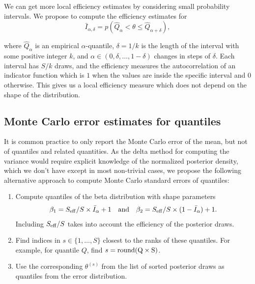 \documentclass[american,]{article}
\theoremstyle{definition}
\begin{document}

We can get more local efficiency estimates by considering small
probability intervals. We propose to compute the efficiency estimates
for
\begin{equation}
\bar{I}_{\alpha,\delta} = p(\hat{Q}_\alpha < \theta \leq \hat{Q}_{\alpha+\delta}),
\end{equation}

where \(\hat{Q}_\alpha\) is an empirical \(\alpha\)-quantile,
\(\delta=1/k\) is the length of the interval with some positive integer
\(k\), and \(\alpha \in (0,\delta,\ldots,1-\delta)\) changes in steps of
\(\delta\). Each interval has \(S/k\) draws, and the efficiency measures
the autocorrelation of an indicator function which is \(1\) when the
values are inside the specific interval and \(0\) otherwise. This gives
us a local efficiency measure which does not depend on the shape of the
distribution.

\hypertarget{mcse}{%
\subsection{Monte Carlo error estimates for quantiles}\label{mcse}}

It is common practice to only report the Monte Carlo error of the mean,
but not of quantiles and related quantities. As the delta method for
computing the variance would require explicit knowledge of the
normalized posterior density, which we don't have except in most non-trivial
cases, we propose the following alternative approach to compute Monte
Carlo standard errors of quantiles:

\begin{enumerate}
\def\labelenumi{\arabic{enumi}.}
\item
  Compute quantiles of the beta distribution with shape parameters
  \begin{equation}
  \beta_1 = S_{\rm eff} / S \times \bar{I}_\alpha+1 \quad \text{and} \quad
  \beta_2 = S_{\rm eff} / S \times (1-\bar{I}_\alpha) + 1.
  \end{equation} Including \(S_{\rm eff}/S\) takes into account the
  efficiency of the posterior draws.
\item
  Find indices in \(s \in \{1,\ldots,S\}\) closest to the ranks of these
  quantiles. For example, for quantile \(Q\), find
  \(s = {\rm round(Q \times S)}\).
\item
  Use the corresponding \(\theta^{(s)}\) from the list of sorted
  posterior draws as quantiles from the error distribution. 
\end{enumerate}
\end{document}
